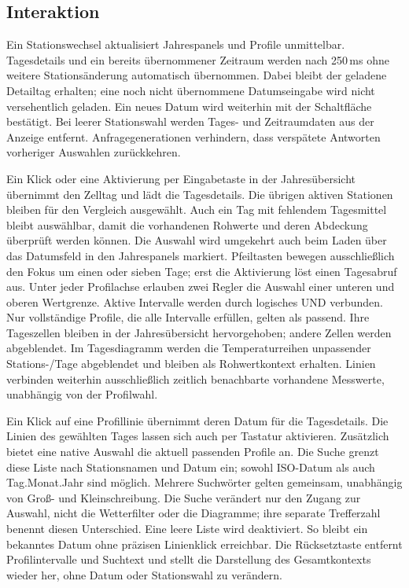 \documentclass[usegeometry=true]{scrartcl}
\begin{document}
\subsection{Interaktion}
Ein Stationswechsel aktualisiert Jahrespanels und Profile unmittelbar.
Tagesdetails und ein bereits übernommener Zeitraum werden nach
250\,ms ohne weitere Stationsänderung automatisch übernommen. Dabei bleibt der
geladene Detailtag erhalten; eine noch nicht übernommene Datumseingabe
wird nicht versehentlich geladen. Ein neues Datum wird weiterhin mit
der Schaltfläche bestätigt. Bei leerer Stationswahl werden Tages- und
Zeitraumdaten aus der Anzeige entfernt. Anfragegenerationen verhindern,
dass verspätete Antworten vorheriger Auswahlen zurückkehren.

Ein Klick oder eine Aktivierung per Eingabetaste
in der Jahresübersicht übernimmt den Zelltag und lädt die Tagesdetails.
Die übrigen aktiven Stationen bleiben für den Vergleich ausgewählt.
Auch ein Tag mit fehlendem Tagesmittel bleibt auswählbar, damit die
vorhandenen Rohwerte und deren Abdeckung überprüft werden können.
Die Auswahl wird umgekehrt auch beim Laden über das Datumsfeld in den
Jahrespanels markiert. Pfeiltasten bewegen ausschließlich den Fokus um
einen oder sieben Tage; erst die Aktivierung löst einen Tagesabruf aus.
Unter jeder Profilachse erlauben zwei Regler die Auswahl einer unteren und
oberen Wertgrenze. Aktive Intervalle werden durch logisches UND verbunden.
Nur vollständige Profile, die alle Intervalle erfüllen, gelten als passend.
Ihre Tageszellen bleiben in der Jahresübersicht hervorgehoben;
andere Zellen werden abgeblendet. Im Tagesdiagramm werden die
Temperaturreihen unpassender Stations-/Tage abgeblendet und bleiben als
Rohwertkontext erhalten. Linien verbinden weiterhin ausschließlich
zeitlich benachbarte vorhandene Messwerte, unabhängig von der Profilwahl.

Ein Klick auf eine Profillinie übernimmt deren Datum für die Tagesdetails.
Die Linien des gewählten Tages lassen sich auch per Tastatur aktivieren.
Zusätzlich bietet eine native Auswahl die aktuell passenden Profile an.
Die Suche grenzt diese Liste nach Stationsnamen und Datum ein; sowohl
ISO-Datum als auch Tag.Monat.Jahr sind möglich. Mehrere Suchwörter gelten
gemeinsam, unabhängig von Groß- und Kleinschreibung. Die Suche verändert
nur den Zugang zur Auswahl, nicht die Wetterfilter oder die Diagramme;
ihre separate Trefferzahl benennt diesen Unterschied. Eine leere Liste
wird deaktiviert. So bleibt ein bekanntes Datum ohne präzisen Linienklick
erreichbar. Die Rücksetztaste entfernt Profilintervalle und Suchtext und stellt
die Darstellung des Gesamtkontexts wieder her,
ohne Datum oder Stationswahl zu verändern.
\end{document}
